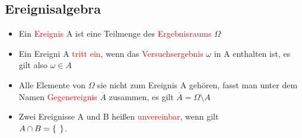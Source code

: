 \documentclass[a4paper,twocolumn,10pt]{onepgnote1}
\begin{document}
\subsection{Ereignisalgebra}
\begin{itemize}
    \item Ein \textcolor{red}{Ereignis} A ist eine Teilmenge des \textcolor{red}{Ergebnisraums} $\Omega$
    \item Ein Ereigni A \textcolor{red}{tritt ein}, wenn das \textcolor{red}{Versuchsergebnis} $\omega$ in A enthalten ist, es gilt also $\omega \in A$
    \item Alle Elemente von $\Omega$ sie nicht zum Ereignis A gehören, fasst man unter dem Namen \textcolor{red}{Gegenereignis} $\overline{A}$ zusammen, es gilt $\overline{A}= \Omega\setminus A$
    \item Zwei Ereignisse A und B heißen \textcolor{red}{unvereinbar}, wenn gilt \\$A \cap B = \{ \hspace{0.15cm}\}$.
\end{itemize}
\end{document}
